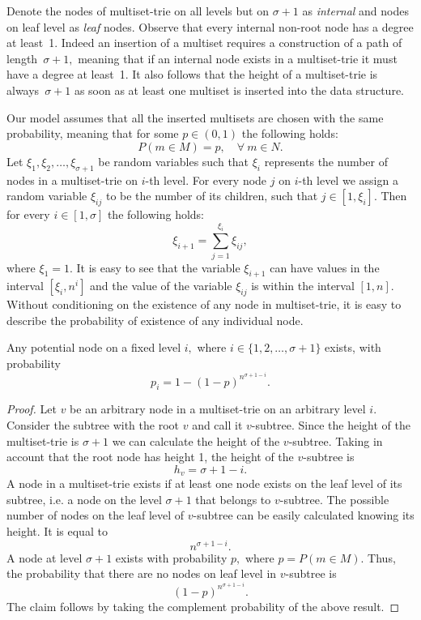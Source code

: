 Denote the nodes of multiset-trie on all levels but on $\sigma + 1$ as \emph{internal}
and nodes on leaf level as \emph{leaf} nodes.
%
Observe that every internal non-root node has a degree at least~1. Indeed an
insertion of a multiset requires a construction of a path of length~$\sigma + 1,$
meaning that if an internal node exists in a multiset-trie it must have a degree
at least~1. It also follows that the height of a multiset-trie is always~$\sigma +1$
as soon as at least one multiset is inserted into the data structure.

Our model assumes that all the inserted multisets are chosen with the same probability,
meaning that for some $p\in (0,1)$ the following holds:
\[
P(m\in M) = p, \quad \forall~m\in N.
\]
%
Let $\xi_1, \xi_2, \ldots, \xi_{\sigma+1}$ be random variables such that $\xi_i$
represents the number of nodes in a multiset-trie on $i$-th level. For every node $j$ 
on $i$-th level we assign a random variable $\xi_{ij}$ to be the number of its children, 
such that $j\in[1,\xi_i].$ Then for every $i\in[1,\sigma]$ the following holds:
%
\begin{equation}\label{eq:sum_recursive}
\xi_{i+1} = \sum_{j=1}^{\xi_i} \xi_{ij},
\end{equation}
%
where $\xi_1 = 1.$
%
It is easy to see that the variable $\xi_{i+1}$ can have values in the interval
$[\xi_i,n^{i}]$ and the value of the variable $\xi_{ij}$ is within the interval $[1,n].$
Without conditioning on the existence of any node in multiset-trie, 
it is easy to describe the probability of existence of any individual node.

\begin{lemma}\label{l:prob-node-existence}
Any potential node on a fixed level $i,$ where $i\in \{ 1,2,\ldots, \sigma +1 \}$ exists, %
with probability
\begin{equation}
p_i=1-(1-p)^{n^{\sigma + 1 -i}}.
\end{equation}
\end{lemma}
\begin{proof}
Let $v$ be an arbitrary node in a multiset-trie on an arbitrary level $i.$ Consider
the subtree with the root $v$ and call it $v$-subtree. Since the height of the
multiset-trie is $\sigma + 1$ we can calculate the height of the $v$-subtree.
Taking in account that the root node has height 1, the height of the $v$-subtree is
%
\[
h_v = \sigma + 1 - i.
\]
%
A node in a multiset-trie exists if at least one node exists on the leaf level of its
subtree, i.e. a node on the level $\sigma + 1$ that belongs to $v$-subtree. The possible
number of nodes on the leaf level of $v$-subtree can be easily calculated knowing its height.
It is equal to
%
\[
n^{\sigma + 1 - i}.
\]
%
A node at level $\sigma+1$ exists with probability $p,$ where $p = P(m\in M).$
Thus, the probability that there are no nodes on leaf level in $v$-subtree is
%
\[
(1-p)^{n^{\sigma +1 - i}}.
\]
%
The claim follows by taking the complement probability of the above result. 

%
\end{proof}

